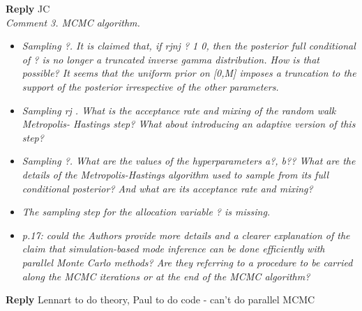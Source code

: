 \documentclass[12pt]{article}
\begin{document}
\textbf{Reply} JC\\


\textit{Comment 3. MCMC algorithm.}
\begin{itemize}
\item[a] \textit{Sampling ?. It is claimed that, if rjnj ? 1 0, then the posterior full conditional of ? is no longer a truncated inverse gamma distribution. How is that possible? It seems that the uniform prior on [0,M] imposes a truncation to the support of the posterior irrespective of the other parameters.}
\item[b] \textit{Sampling rj . What is the acceptance rate and mixing of the random walk Metropolis-
Hastings step? What about introducing an adaptive version of this step?}\\
\item[c] \textit{Sampling ?. What are the values of the hyperparameters a?, b?? What are the details
of the Metropolis-Hastings algorithm used to sample from its full conditional posterior?
And what are its acceptance rate and mixing?}
\item[d] \textit{The sampling step for the allocation variable ? is missing.}\\
\item[e] \textit{p.17: could the Authors provide more details and a clearer explanation of the claim
that simulation-based mode inference can be done efficiently with parallel Monte Carlo
methods? Are they referring to a procedure to be carried along the MCMC iterations or
at the end of the MCMC algorithm?}\\
\end{itemize}


\textbf{Reply} Lennart to do theory, Paul to do code - can't do parallel MCMC\\
\end{document}
